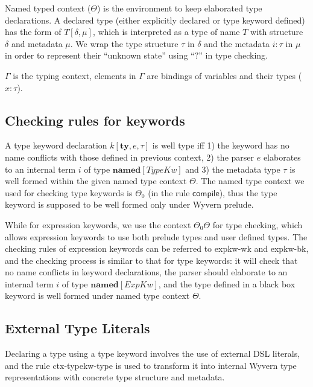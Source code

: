 \documentclass{sig-alternate}
\begin{document}
Named typed context ($\Theta$) is the environment to keep elaborated type declarations. A declared type (either explicitly declared or type keyword defined) has the form of $T[\delta,\mu]$, which is interpreted as a type of name $T$ with structure $\delta$ and metadata $\mu$. We wrap the type structure $\tau$ in $\delta$ and the metadata $i:\tau$ in $\mu$ in order to represent their ``unknown state'' using ``$?$'' in type checking.

$\Gamma$ is the typing context, elements in $\Gamma$ are bindings of variables and their types ($x:\tau$).

\subsection{Checking rules for keywords}
A type keyword declaration $k[\mathbf{ty},e,\tau]$ is well type iff 1) the keyword has no name conflicts with those defined in previous context, 2) the parser $e$ elaborates to an internal term $i$ of type $\mathbf{named}[TypeKw]$ and 3) the metadata type $\tau$ is well formed within the given named type context $\Theta$. The named type context we used for checking type keywords is $\Theta_0$ (in the rule $\mathsf{compile}$), thus the type keyword is supposed to be well formed only under Wyvern prelude.

While for expression keywords, we use the context $\Theta_0\Theta$ for type checking, which allows expression keywords to use both prelude types and user defined types. The checking rules of expression keywords can be referred to expkw-wk and expkw-bk, and the checking process is similar to that for type keywords: it will check that no name conflicts in keyword declarations, the parser should elaborate to an internal term $i$ of type $\mathbf{named}[ExpKw]$, and the type defined in a black box keyword is well formed under named type context $\Theta$.

\subsection{External Type Literals}
Declaring a type using a type keyword involves the use of external DSL literals, and the rule ctx-typekw-type is used to transform it into internal Wyvern type representations with concrete type structure and metadata.
\end{document}
